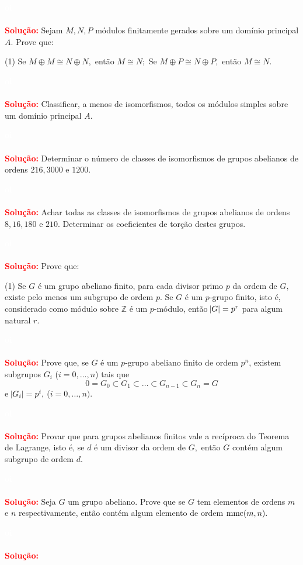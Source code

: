 \documentclass[11pt,a4paper]{article}
\newcounter{exercicio}[section]
\newcommand{\dividiritens}[1]{\begin{tasks}[counter-format={(tsk[a])},label-width=3.6ex, label-format = {\bfseries}, column-sep = {0pt}](1) #1 \end{tasks}}
\newcommand{\pers}[1]{\textcolor{Floresta}{$\negrito{(#1)} $}}
\newcommand{\solucao}[1]{
\textbf{\textcolor{white}{oi}\\ \\ \textcolor{red}{Solução:}} #1}
\begin{document}
\solucao{}
 Sejam $M, N, P$ módulos finitamente gerados sobre um domínio principal $A.$ Prove que:
\dividiritens{
\task[\pers{a}] Se $M \oplus M \cong N \oplus N,$ então $M \cong N;$
\task[\pers{b}] Se $M \oplus P \cong N \oplus P,$ então $M \cong N.$
}
\solucao{}
 Classificar, a menos de isomorfismos, todos os módulos simples sobre um domínio principal $A.$
\solucao{}
 Determinar o número de classes de isomorfismos de grupos abelianos de ordens $216, 3000$ e $1200.$ 
\solucao{}
 Achar todas as classes de isomorfismos de grupos abelianos de ordens $8, 16, 180$ e $210.$ Determinar os coeficientes de torção destes grupos.
\solucao{}
 Prove que:
\dividiritens{
\task[\pers{a}] Se $G$ é um grupo abeliano finito, para cada divisor primo $p$ da ordem de $G,$ existe pelo menos um subgrupo de ordem $p.$
\task[\pers{b}]  Se $G$ é um $p$-grupo finito, isto é, considerado como módulo sobre $\mathbb{Z}$ é um $p$-módulo, então $\abs{G} = p^r$ para algum natural $r.$
}
\solucao{}
 Prove que, se $G$ é um $p$-grupo abeliano finito de ordem $p^n$, existem subgrupos $G_i$ ($i = 0, \ldots , n$) tais que
\[
0 = G_0 \subset G_1 \subset \ldots \subset G_{n-1} \subset G_n = G
\]
e $\abs{G_i} = p^i,$ ($i = 0, \ldots, n).$
\solucao{}
 Provar que para grupos abelianos finitos vale a recíproca do Teorema de Lagrange, isto é, se $d$ é um divisor da ordem de $G,$ então $G$ contém algum subgrupo de ordem $d.$
\solucao{}
 Seja $G$ um grupo abeliano. Prove que se $G$ tem elementos de ordens $m$ e $n$ respectivamente, então contém algum elemento de ordem ${\rm mmc}(m, n).$
\solucao{}
\end{document}
